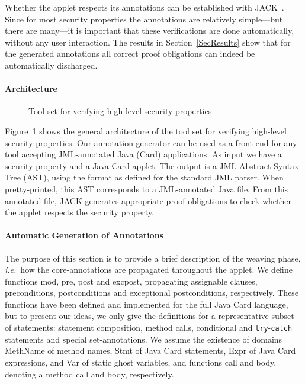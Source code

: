 Whether the applet respects its annotations can be established with
JACK~\cite{BRL-JACK}. Since for most security properties the
annotations are relatively simple---but there are many---it is
important that these verifications are done automatically, without any
user interaction. The results in Section~\ref{SecResults} show that
for the generated annotations all correct proof obligations can indeed
be automatically discharged.

\paragraph*{Architecture}

\begin{figure}[pht]
\begin{center}
\end{center}
\caption{\sc Tool set for verifying high-level security properties}\label{FigArch}
\end{figure}



Figure~\ref{FigArch} shows the general architecture of the tool set
for verifying high-level security properties. Our annotation generator
can be used as a front-end for any tool accepting JML-annotated Java
(Card) applications. As input we have a security property and a Java
Card applet. The output is a JML Abstract Syntax Tree (AST), using the
format as defined for the standard JML parser. When pretty-printed,
this AST corresponds to a JML-annotated Java file. From this
annotated file, JACK generates appropriate proof obligations to check
whether the applet respects the security property.

\paragraph*{Automatic Generation of Annotations}
The purpose of this section is to provide a brief description of the
weaving phase, \emph{i.e.}~how the core-annotations are propagated
throughout the applet. We define functions \textsf{mod}, \textsf{pre},
\textsf{post} and \textsf{exc\-post}, propagating assignable clauses,
preconditions, postconditions and exceptional postconditions,
respectively. These functions have been defined and implemented for
the full Java Card language, but to present our ideas, we only give
the definitions for a representative subset of statements: statement
composition, method calls, conditional and \texttt{try}-\texttt{catch}
statements and special set-annotations. We assume the existence of
domains \textsf{MethName} of method names, \textsf{Stmt} of Java Card
statements, \textsf{Expr} of Java Card expressions, and \textsf{Var}
of static ghost variables, and functions \textsf{call} and
\textsf{body}, denoting a method call and body, respectively.


